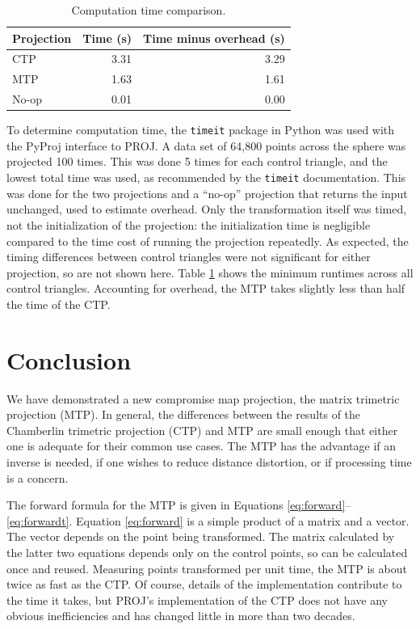 \documentclass[]{interact}
\begin{document}
\begin{table}
\begin{tabular}{ l r r}
  Projection & Time (s) & Time minus overhead (s)\\
\hline
  CTP & 3.31 & 3.29 \\
  MTP & 1.63 & 1.61 \\
  No-op & 0.01 & 0.00
\end{tabular}
\caption{Computation time comparison.}
\label{table:time}
\end{table}

To determine computation time, the \texttt{timeit} package in Python
\citep{python} was used with the PyProj interface to PROJ. \citep{pyproj} A
data set of 64,800 points across the sphere was projected 100 times. This was
done 5 times for each control triangle, and the lowest total time was used, as
recommended by the \texttt{timeit} documentation. This was done for the two
projections and a ``no-op'' projection that returns the input unchanged, used
to estimate overhead. Only the transformation itself was timed, not the
initialization of the projection: the initialization time is negligible
compared to the time cost of running the projection repeatedly. As expected,
the timing differences between control triangles were not significant for
either projection, so are not shown here. Table \ref{table:time} shows the
minimum runtimes across all control triangles. Accounting for overhead,
the MTP takes slightly less than half the time of the CTP.

\section{Conclusion}
We have demonstrated a new compromise map projection, the matrix trimetric
projection (MTP). In general, the differences between the results of the
Chamberlin trimetric projection (CTP) and MTP are small enough that either one
is adequate for their common use cases.
The MTP has the advantage if an inverse is needed,
if one wishes to reduce distance distortion, or if processing time is a concern.

The forward formula for the MTP is given in Equations
\ref{eq:forward}--\ref{eq:forwardt}. Equation \ref{eq:forward} is a simple
product of a matrix and a vector. The vector depends on the point being
transformed. The matrix calculated by the latter two equations depends only on
the control points, so can be calculated once and reused. Measuring points
transformed per unit time, the MTP is about twice as fast as the CTP. Of
course, details of the implementation contribute to the time it takes, but
PROJ's implementation of the CTP does not have any obvious inefficiencies
and has changed little in more than two decades.
\end{document}
